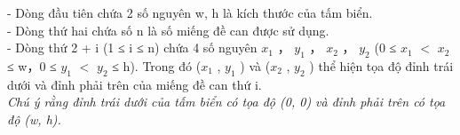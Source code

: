 - Dòng đầu tiên chứa 2 số nguyên w, h là kích thước của tấm biển.   
\\   - Dòng thứ hai chứa số n là số miếng đề can được sử dụng.   
\\   - Dòng thứ 2 + i (1 ≤ i ≤ n) chứa 4 số nguyên $x_{1}$   ， $y_{1}$   ， $x_{2}$   ， $y_{2}$   (0 ≤ $x_{1}$   $<$ $x_{2}$   ≤ w，0 ≤ $y_{1}$   $<$ $y_{2}$   ≤ h). Trong đó ($x_{1}$   , $y_{1}$   ) và ($x_{2}$   , $y_{2}$   ) thể hiện tọa độ đỉnh trái dưới và đỉnh phải trên của miếng đề can thứ i.   
\\\textit{     Chú ý rằng đỉnh trái dưới của tấm biển có tọa độ (0, 0) và đỉnh phải trên có tọa độ (w, h).    }